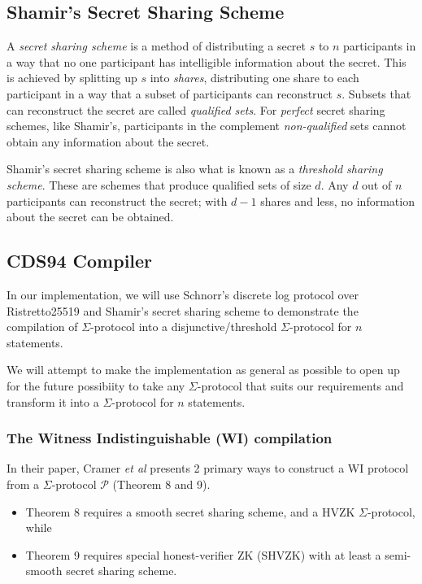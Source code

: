 \subsection{Shamir's Secret Sharing Scheme}
A \textit{secret sharing scheme} is a method of distributing a secret $s$ to $n$ participants in a way that no one participant has intelligible information about the secret. This is achieved by splitting up $s$ into \textit{shares}, distributing one share to each participant in a way that a subset of participants can reconstruct $s$. Subsets that can reconstruct the secret are called \textit{qualified sets}. For \textit{perfect} secret sharing schemes, like Shamir's, participants in the complement \textit{non-qualified} sets cannot obtain any information about the secret.

Shamir's secret sharing scheme \cite{DBLP:journals/cacm/Shamir79} is also what is known as a \textit{threshold sharing scheme}. These are schemes that produce  qualified sets of size $d$. Any $d$ out of $n$ participants can reconstruct the secret; with $d-1$ shares and less, no  information about the secret can be obtained. 

\subsection{CDS94 Compiler}


In our implementation, we will use Schnorr's discrete log protocol over Ristretto25519 and Shamir's secret sharing scheme to demonstrate the compilation of $\Sigma$-protocol into a disjunctive/threshold $\Sigma$-protocol for $n$ statements. 

We will attempt to make the implementation as general as possible to open up for the future possibiity to take any $\Sigma$-protocol that suits our requirements and transform it into a $\Sigma$-protocol for $n$ statements.  

\subsubsection{The Witness Indistinguishable (WI) compilation}

In their paper, Cramer {\em{et al}} \cite{CDS94} presents 2 primary ways to construct a WI protocol from a $\Sigma$-protocol $\mathcal P$ (Theorem 8 and 9). 

\begin{itemize}
    \item Theorem 8 requires a smooth secret sharing scheme, and a HVZK $\Sigma$-protocol, while
    \item Theorem 9 requires special honest-verifier ZK (SHVZK) with at least a semi-smooth secret sharing scheme.
\end{itemize}

